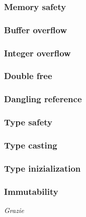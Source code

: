 \documentclass{beamer}
\begin{document}
\begin{frame}
    \frametitle{Memory safety}
    
\end{frame}

\begin{frame}
    \frametitle{Buffer overflow}
    
\end{frame}

\begin{frame}
    \frametitle{Integer overflow}
    
\end{frame}

\begin{frame}
    \frametitle{Double free}
    
\end{frame}

\begin{frame}
    \frametitle{Dangling reference}
    
\end{frame}

\begin{frame}
    \frametitle{Type safety}
    
\end{frame}

\begin{frame}
    \frametitle{Type casting}
    
\end{frame}

\begin{frame}
    \frametitle{Type inizialization}

\end{frame}

\begin{frame}
    \frametitle{Immutability}
    
\end{frame}

\begin{frame}
    \centering \Large
    \emph{Grazie}
\end{frame}
\end{document}
